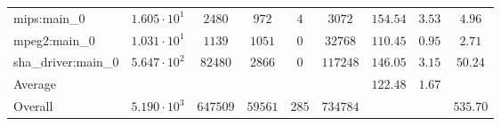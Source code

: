 \begin{tabular}{|l|c|c|c|c|c|c|c|c|}
mips:main\_0            & $ 1.605 \cdot 10^{1}  $ & $ 2480   $ & $ 972   $ & $ 4   $ & $ 3072   $ & $ 154.54      $ & $ 3.53    $ & $ 4.96    $ \\
mpeg2:main\_0           & $ 1.031 \cdot 10^{1}  $ & $ 1139   $ & $ 1051  $ & $ 0   $ & $ 32768  $ & $ 110.45      $ & $ 0.95    $ & $ 2.71    $ \\
sha\_driver:main\_0     & $ 5.647 \cdot 10^{2}  $ & $ 82480  $ & $ 2866  $ & $ 0   $ & $ 117248 $ & $ 146.05      $ & $ 3.15    $ & $ 50.24   $ \\
\hline
Average                 & $                     $ & $        $ & $       $ & $     $ & $        $ & $ 122.48      $ & $ 1.67    $ & $         $ \\
\hline
Overall                 & $ 5.190 \cdot 10^{3}  $ & $ 647509 $ & $ 59561 $ & $ 285 $ & $ 734784 $ & $             $ & $         $ & $ 535.70  $ \\
\hline
\end{tabular}

